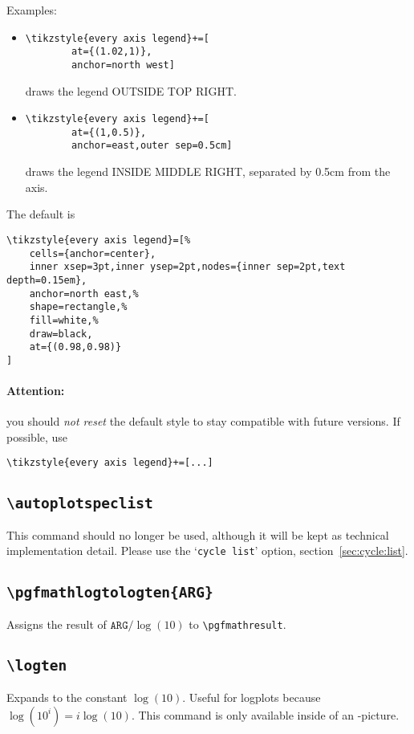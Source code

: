 Examples:
\begin{itemize}
\item 
\begin{lstlisting}
\tikzstyle{every axis legend}+=[
		at={(1.02,1)},
		anchor=north west]
\end{lstlisting}
draws the legend OUTSIDE TOP RIGHT.

\item
\begin{lstlisting}
\tikzstyle{every axis legend}+=[
		at={(1,0.5)},
		anchor=east,outer sep=0.5cm]
\end{lstlisting}
draws the legend INSIDE MIDDLE RIGHT, separated by 0.5cm from the axis.
\end{itemize}

\noindent
The default is
\begin{lstlisting}
\tikzstyle{every axis legend}=[%
	cells={anchor=center},
	inner xsep=3pt,inner ysep=2pt,nodes={inner sep=2pt,text depth=0.15em},
	anchor=north east,%
	shape=rectangle,%
	fill=white,%
	draw=black,
	at={(0.98,0.98)}
]
\end{lstlisting}
\paragraph{Attention:} you should \emph{not reset} the default style to stay compatible with future versions. If possible, use
\begin{lstlisting}
\tikzstyle{every axis legend}+=[...]
\end{lstlisting}


\subsection{\texttt{\textbackslash autoplotspeclist}}
This command should no longer be used, although it will be kept as technical implementation detail. Please use the `\texttt{cycle list}' option, section~\ref{sec:cycle:list}.

\subsection{\texttt{\textbackslash pgfmathlogtologten\{ARG\}}}
Assigns the result of $\texttt{ARG}/\log(10)$ to \lstinline!\pgfmathresult!.

\subsection{\texttt{\textbackslash logten}}
Expands to the constant $\log(10)$. Useful for logplots because $\log(10^i) = i\log(10)$. This command is only available inside of an \Tikz-picture.

